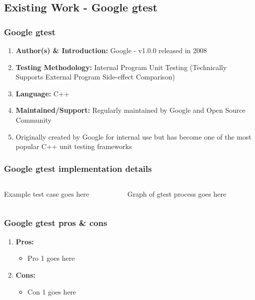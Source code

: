 \documentclass[xcolor]{beamer}
\begin{document}
\subsection{Existing Work - Google gtest}
\begin{frame}
	\frametitle{Google gtest}
	\begin{enumerate}
		\setlength\itemsep{1em}
		\item \textbf{Author(s) \& Introduction:} Google - v1.0.0 released in 2008
			\pause
		\item \textbf{Testing Methodology:} Internal Program Unit Testing (Technically Supports External Program Side-effect Comparison)
			\pause
		\item \textbf{Language:} C++
			\pause
		\item \textbf{Maintained/Support:} Regularly maintained by Google and Open Source Community
			\pause 
		\item Originally created by Google for internal use but has become one of the most popular C++ unit testing frameworks
	\end{enumerate}
\end{frame}
\begin{frame}
	\frametitle{Google gtest implementation details}
	\begin{columns}
		\begin{column}{0.45\textwidth}
			Example test case goes here
		\end{column}
		\begin{column}{0.45\textwidth}
			Graph of gtest process goes here
		\end{column}
	\end{columns}
\end{frame}
\begin{frame}
	\frametitle{Google gtest pros \& cons}
	\begin{enumerate}
		\item \textbf{Pros:}
		\begin{itemize}
			\item Pro 1 goes here
		\end{itemize}
			\pause
		\item \textbf{Cons:}
		\begin{itemize}
			\item Con 1 goes here
		\end{itemize}
	\end{enumerate}
\end{frame}
\end{document}
